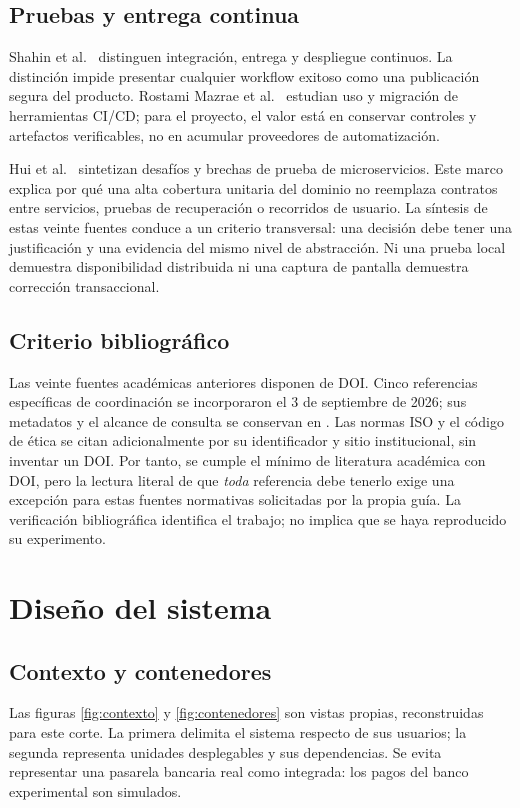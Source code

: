 \documentclass[12pt,a4paper]{article}
\newcommand{\seccion}[1]{\section{#1}}
\begin{document}
\subsection{Pruebas y entrega continua}
Shahin et al.\ \cite{shahin2017continuous} distinguen integración, entrega y despliegue continuos. La distinción impide presentar cualquier workflow exitoso como una publicación segura del producto. Rostami Mazrae et al.\ \cite{rostami2023cicd} estudian uso y migración de herramientas CI/CD; para el proyecto, el valor está en conservar controles y artefactos verificables, no en acumular proveedores de automatización.

Hui et al.\ \cite{hui2025unveiling} sintetizan desafíos y brechas de prueba de microservicios. Este marco explica por qué una alta cobertura unitaria del dominio no reemplaza contratos entre servicios, pruebas de recuperación o recorridos de usuario. La síntesis de estas veinte fuentes conduce a un criterio transversal: una decisión debe tener una justificación y una evidencia del mismo nivel de abstracción. Ni una prueba local demuestra disponibilidad distribuida ni una captura de pantalla demuestra corrección transaccional.

\subsection{Criterio bibliográfico}
Las veinte fuentes académicas anteriores disponen de DOI. Cinco referencias específicas de coordinación se incorporaron el 3 de septiembre de 2026; sus metadatos y el alcance de consulta se conservan en . Las normas ISO y el código de ética se citan adicionalmente por su identificador y sitio institucional, sin inventar un DOI. Por tanto, se cumple el mínimo de literatura académica con DOI, pero la lectura literal de que \emph{toda} referencia debe tenerlo exige una excepción para estas fuentes normativas solicitadas por la propia guía. La verificación bibliográfica identifica el trabajo; no implica que se haya reproducido su experimento.

\seccion{Diseño del sistema}
\subsection{Contexto y contenedores}
Las figuras \ref{fig:contexto} y \ref{fig:contenedores} son vistas propias, reconstruidas para este corte. La primera delimita el sistema respecto de sus usuarios; la segunda representa unidades desplegables y sus dependencias. Se evita representar una pasarela bancaria real como integrada: los pagos del banco experimental son simulados.
\end{document}
